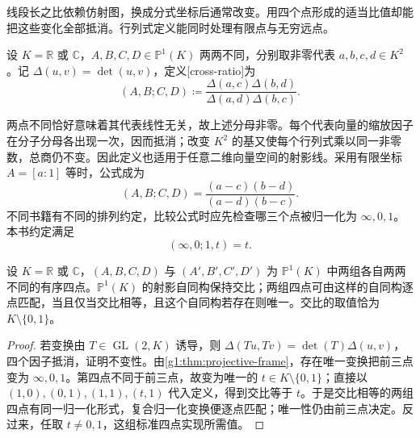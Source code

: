 线段长之比依赖仿射图，换成分式坐标后通常改变。用四个点形成的适当比值却能把这些变化全部抵消。行列式定义能同时处理有限点与无穷远点。

\begin{definition}[交比]\label{g1:def:cross-ratio}
	设 \(K=\mathbb R\) 或 \(\mathbb C\)，\(A,B,C,D\in\mathbb P^1(K)\) 两两不同，分别取非零代表 \(a,b,c,d\in K^2\)。记 \(\Delta(u,v)=\det(u,v)\)，定义[cross-ratio]为
	\begin{equation}\label{g1:eq:cross-ratio}
		(A,B;C,D)\coloneqq
		\frac{\Delta(a,c)\Delta(b,d)}{\Delta(a,d)\Delta(b,c)}.
	\end{equation}
\end{definition}

两点不同恰好意味着其代表线性无关，故上述分母非零。每个代表向量的缩放因子在分子分母各出现一次，因而抵消；改变 \(K^2\) 的基又使每个行列式乘以同一非零数，总商仍不变。因此定义也适用于任意二维向量空间的射影线。采用有限坐标 \(A=[a:1]\) 等时，公式成为
\[
	(A,B;C,D)=\frac{(a-c)(b-d)}{(a-d)(b-c)}.
\]
不同书籍有不同的排列约定，比较公式时应先检查哪三个点被归一化为 \(\infty,0,1\)。本书约定满足
\begin{equation}\label{g1:eq:cross-ratio-normalization}
	(\infty,0;1,t)=t.
\end{equation}

\begin{proposition}\label{g1:prop:cross-ratio-orbits}
	设 \(K=\mathbb R\) 或 \(\mathbb C\)，\((A,B,C,D)\) 与 \((A',B',C',D')\) 为 \(\mathbb P^1(K)\) 中两组各自两两不同的有序四点。\(\mathbb P^1(K)\) 的射影自同构保持交比；两组四点可由这样的自同构逐点匹配，当且仅当交比相等，且这个自同构若存在则唯一。交比的取值恰为 \(K\setminus\{0,1\}\)。
\end{proposition}
\begin{proof}
	若变换由 \(T\in\operatorname{GL}(2,K)\) 诱导，则 \(\Delta(Tu,Tv)=\det(T)\Delta(u,v)\)，四个因子抵消，证明不变性。由\cref{g1:thm:projective-frame}，存在唯一变换把前三点变为 \(\infty,0,1\)。第四点不同于前三点，故变为唯一的 \(t\in K\setminus\{0,1\}\)；直接以 \((1,0),(0,1),(1,1),(t,1)\) 代入定义，得到交比等于 \(t\)。于是交比相等的两组四点有同一归一化形式，复合归一化变换便逐点匹配；唯一性仍由前三点决定。反过来，任取 \(t\ne0,1\)，这组标准四点实现所需值。
\end{proof}

